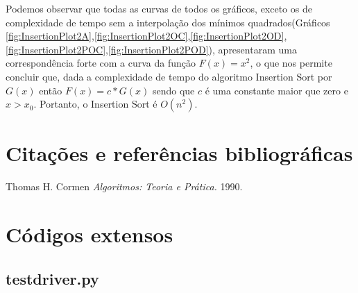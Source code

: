 \documentclass[12pt,a4paper,twoside]{report}
\begin{document}
Podemos observar que todas as curvas de todos os gráficos, exceto os de complexidade de tempo sem a interpolação dos mínimos quadrados(Gráficos \ref{fig:InsertionPlot2A},\ref{fig:InsertionPlot2OC},\ref{fig:InsertionPlot2OD},\ref{fig:InsertionPlot2POC},\ref{fig:InsertionPlot2POD}), apresentaram uma correspondência forte com a curva da função $F(x) = x^2$, o que nos permite concluir que, dada a complexidade de tempo do algoritmo Insertion Sort por $G(x)$ então $F(x) = c * G(x)$ sendo que $c$ é uma constante maior que zero e $x > x_0$. Portanto, o Insertion Sort é $O(n^2)$.

\chapter{Citações e referências bibliográficas}
	\begin{thebibliography}{1}
		
		 Thomas H. Cormen {\em 
			Algoritmos: Teoria e Prática.
		}  1990.
		
	\end{thebibliography}







\clearpage
{}
\appendix

\chapter{Códigos extensos \label{ap:testdriver}}
\section{testdriver.py}

\end{document}

